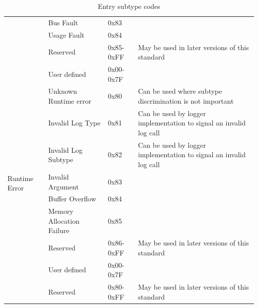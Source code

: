 \documentclass[paper=letter, fontsize=10pt]{scrartcl} %
\numberwithin{equation}{section} %
\numberwithin{figure}{section} %
\numberwithin{table}{section} %
\begin{document}
\begin{table}[ht!]
\begin{center}
\begin{tabularx}{\textwidth}{|l|l|l|X|}
            \textbf{}                       & Bus Fault                 & 0x83               &                                                                    \\ \cline{2-4}
            \textbf{}                       & Usage Fault               & 0x84               &                                                                    \\ \cline{2-4}
            \textbf{}                       & Reserved                  & 0x85-0xFF          & May be used in later versions of this standard                     \\ \hline
            \multirow{10}{*}{Runtime Error} & User defined              & 0x00-0x7F          &                                                                    \\ \cline{2-4}
            \textbf{}                       & Unknown Runtime error     & 0x80               & Can be used where subtype discrimination is not important          \\ \cline{2-4}
            \textbf{}                       & Invalid Log Type          & 0x81               & Can be used by logger implementation to signal an invalid log call \\ \cline{2-4}
            \textbf{}                       & Invalid Log Subtype       & 0x82               & Can be used by logger implementation to signal an invalid log call \\ \cline{2-4}
            \textbf{}                       & Invalid Argument          & 0x83               &                                                                    \\ \cline{2-4}
            \textbf{}                       & Buffer Overflow           & 0x84               &                                                                    \\ \cline{2-4}
            \textbf{}                       & Memory Allocation Failure & 0x85               &                                                                    \\ \cline{2-4}
            \textbf{}                       & Reserved                  & 0x86-0xFF          & May be used in later versions of this standard                     \\ \hline
            \multirow{2}{*}{All others}     & User defined              & 0x00-0x7F          &                                                                    \\ \cline{2-4}
            \textbf{}                       & Reserved                  & 0x80-0xFF          & May be used in later versions of this standard                     \\ \hline
        \end{tabularx}
        \caption{Entry subtype codes}
        \label{tab:le:est}
    \end{center}
\end{table}
\end{document}
